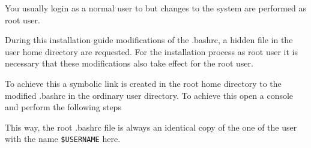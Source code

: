 % 
%               
%          
% 


You usually login as a normal user to \marktool{\opensusename} but changes to the system are performed as root user.

During this installation guide modifications of the .bashrc, a hidden file in the user home directory are requested. For the installation process as root user it is necessary that these modifications also take effect for the root user.

To achieve this a symbolic link is created in the root home directory to the modified .bashrc in the ordinary user directory. To achieve this open a console and perform the following steps


This way, the root .bashrc file is always an identical copy of the one of the user with the name \verb+$USERNAME+ here.